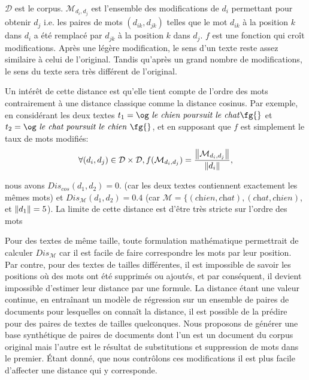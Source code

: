 $\mathcal{D}$ est le corpus. $\mathcal{M}_{d_i, d_j}$ est l'ensemble des modifications de $d_i$ permettant pour obtenir $d_j$ i.e. les paires de mots $(d_{ik}, d_{jk})$ telles que le mot $d_{ik}$ à la position $k$ dans $d_i$ a été remplacé par $d_{jk}$ à la position $k$ dans $d_j$. $f$ est une fonction qui croît modifications. Après une légère modification, le sens d'un texte reste assez similaire à celui de l'original. Tandis qu'après un grand nombre de modifications, le sens du texte sera très différent de l'original. %

Un intérêt de cette distance est qu'elle tient compte de l'ordre des mots contrairement à une distance classique comme la distance cosinus. Par exemple, en considérant les deux textes  $t_1 = \text{\og \textit{le chien poursuit le chat}\fg{}}$ et $t_2 = \text{\og \textit{le chat poursuit le chien} \fg{}}$, et en supposant que $f$ est simplement le taux de mots modifiés:
\begin{equation}
\forall (d_i, d_j) \in \mathcal{D} \times \mathcal{D}, f(\mathcal{M}_{d_i, d_j}) = \frac{\left\lVert\mathcal{M}_{d_i, d_j}\right\rVert}{\left\lVert d_i\right\rVert},
\end{equation}

nous avons $Dis_{cos}(d_1, d_2) = 0.$ (car les deux textes contiennent exactement les mêmes mots) et $Dis_\mathcal{M}(d_1, d_2)=0.4$ (car $\mathcal{M} = \lbrace (\textit{chien}, \textit{chat}), (\textit{chat}, \textit{chien})$,  et $\left\lVert d_1\right\rVert = 5$). La limite de cette distance est d'être très stricte sur l'ordre des mots

Pour des textes de même taille, toute formulation mathématique permettrait de calculer $Dis_\mathcal{M}$ car il est facile de faire correspondre les mots par leur position. Par contre, pour des textes de tailles différentes, il est impossible de savoir les positions où des mots ont été supprimés ou ajoutés, et par conséquent, il devient impossible d'estimer leur distance par une formule. La distance étant une valeur continue, en entraînant un modèle de régression sur un ensemble de paires de documents pour lesquelles on connaît la distance, il est possible de la prédire pour des paires de textes de tailles quelconques. Nous proposons de générer une base synthétique de paires de documents dont l'un est un document du corpus original mais l'autre est le résultat de substitutions et suppression de mots dans le premier. Étant donné, que nous contrôlons ces modifications il est plus facile d'affecter une distance qui y corresponde.

